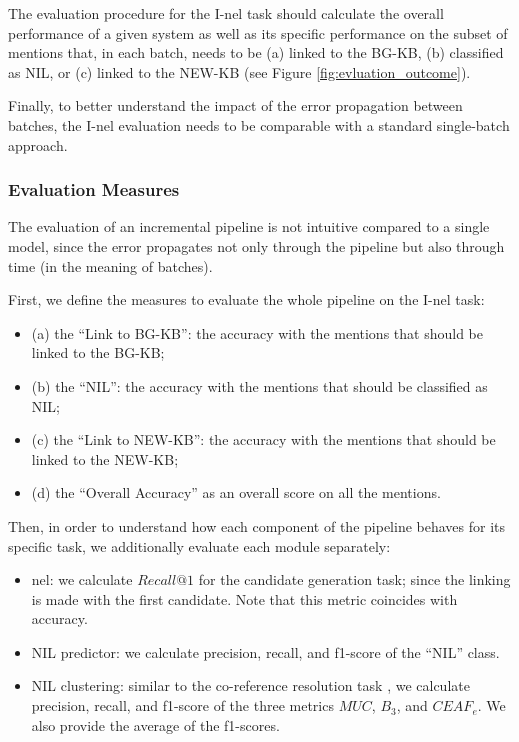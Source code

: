 The evaluation procedure for the I-\ac{nel} task should calculate the overall performance of a given system as well as 
its specific performance on the subset of mentions that, in each batch, needs to be (a) linked to the BG-KB, (b) classified as NIL, or (c) linked to the NEW-KB (see Figure \ref{fig:evluation_outcome}).

Finally, to better understand the impact of the error propagation between batches, the I-\ac{nel} evaluation needs to be comparable with a standard single-batch approach.

\subsubsection{Evaluation Measures} \label{sec:evaluation2}
The evaluation of an incremental pipeline is not intuitive compared to a single model, since the error propagates not only through the pipeline but also through time (in the meaning of batches).

First, we define the measures to evaluate the whole pipeline on the I-\ac{nel} task:
\begin{itemize}
    \item (a) the ``Link to BG-KB'': the accuracy with the mentions that should be linked to the BG-KB;
    \item (b) the ``NIL'': the accuracy with the mentions that should be classified as NIL;
    \item (c) the ``Link to NEW-KB'': the accuracy with the mentions that should be linked to the NEW-KB;
    \item (d) the ``Overall Accuracy'' as an overall score on all the mentions.
\end{itemize}

Then, in order to understand how each component of the pipeline behaves for its specific task, we additionally evaluate each module separately:
\begin{itemize}
    \item \ac{nel}: we calculate $Recall@1$ for the candidate generation task; since the linking is made with the first candidate. Note that this metric coincides with accuracy.
    \item NIL predictor: we calculate precision, recall, and f1-score of the ``NIL'' class.
    \item NIL clustering: similar to the co-reference resolution task \cite{streaming_crossdoc_coreference}, we calculate precision, recall, and f1-score of the three metrics $MUC$, $B_3$, and $CEAF_e$. We also provide the average of the f1-scores.
\end{itemize}

